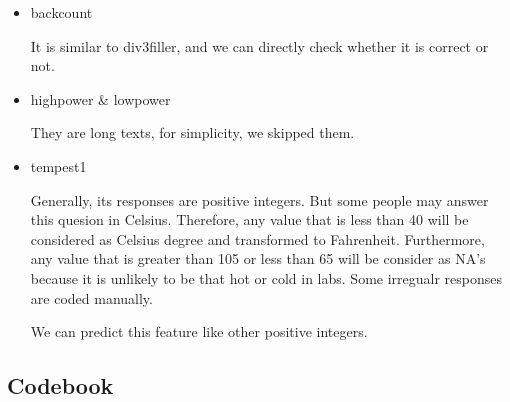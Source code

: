 \documentclass[11pt, a4paper]{article}
\begin{document}
\begin{itemize}
	\item {backcount}
	\par{It is similar to div3filler, and we can directly check whether it is correct or not.
}
	
	\item {highpower \& lowpower}
	\par{They are long texts, for simplicity, we skipped them.
}

	\item {tempest1}
	\par{Generally, its responses are positive integers. But some people may answer this quesion in Celsius. Therefore, any value that is less than 40 will be considered as Celsius degree and transformed to Fahrenheit. Furthermore, any value that is greater than 105 or less than 65 will be consider as NA's because it is unlikely to be that hot or cold in labs. Some irregualr responses are coded manually.}
	\par{We can predict this feature like other positive integers.}
\end{itemize}

\begin{appendices}
	\section{Codebook}
	\label{appendix:codebook}
	
\end{appendices}
\end{document}
